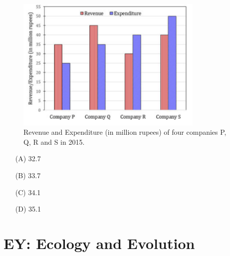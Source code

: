 \begin{enumerate}
\begin{center}
\begin{figure}[H]
    \includegraphics[width=0.8\textwidth]{figs/fig2.png}
\caption{Revenue and Expenditure (in million rupees) of four companies P, Q, R and S in 2015.}
\label{fig:revenue-bar-2015}
\end{figure}
\end{center}
\begin{itemize}
    \item[(A)] 32.7
    \item[(B)] 33.7
    \item[(C)] 34.1
    \item[(D)] 35.1
\end{itemize}
\end{enumerate}

\section*{EY: Ecology and Evolution}

